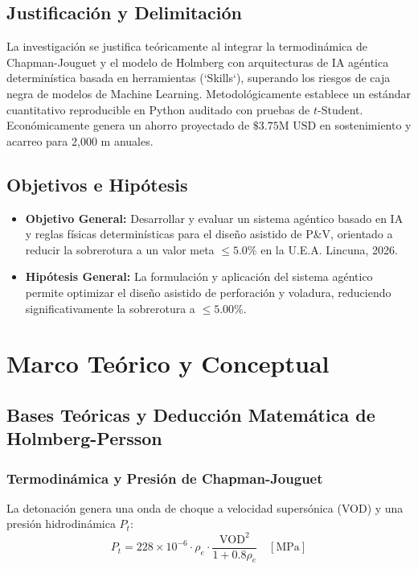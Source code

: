\documentclass[12pt,a4paper,oneside]{book}
\begin{document}
\section{Justificación y Delimitación}
La investigación se justifica teóricamente al integrar la termodinámica de Chapman-Jouguet y el modelo de Holmberg con arquitecturas de IA agéntica determinística basada en herramientas (`Skills`), superando los riesgos de caja negra de modelos de Machine Learning. Metodológicamente establece un estándar cuantitativo reproducible en Python auditado con pruebas de $t$-Student. Económicamente genera un ahorro proyectado de $\$3.75\text{M USD}$ en sostenimiento y acarreo para 2,000 m anuales.

\section{Objetivos e Hipótesis}
\begin{itemize}
    \item \textbf{Objetivo General:} Desarrollar y evaluar un sistema agéntico basado en IA y reglas físicas determinísticas para el diseño asistido de P\&V, orientado a reducir la sobrerotura a un valor meta $\le 5.0\%$ en la U.E.A. Lincuna, 2026.
    \item \textbf{Hipótesis General:} La formulación y aplicación del sistema agéntico permite optimizar el diseño asistido de perforación y voladura, reduciendo significativamente la sobrerotura a $\le 5.00\%$.
\end{itemize}

\chapter{Marco Teórico y Conceptual}

\section{Bases Teóricas y Deducción Matemática de Holmberg-Persson}
\subsection{Termodinámica y Presión de Chapman-Jouguet}
La detonación genera una onda de choque a velocidad supersónica (VOD) y una presión hidrodinámica $P_t$:
\begin{equation}
P_t = 228 \times 10^{-6} \cdot \rho_e \cdot \frac{\text{VOD}^2}{1 + 0.8\rho_e} \quad [\text{MPa}]
\end{equation}
\end{document}
